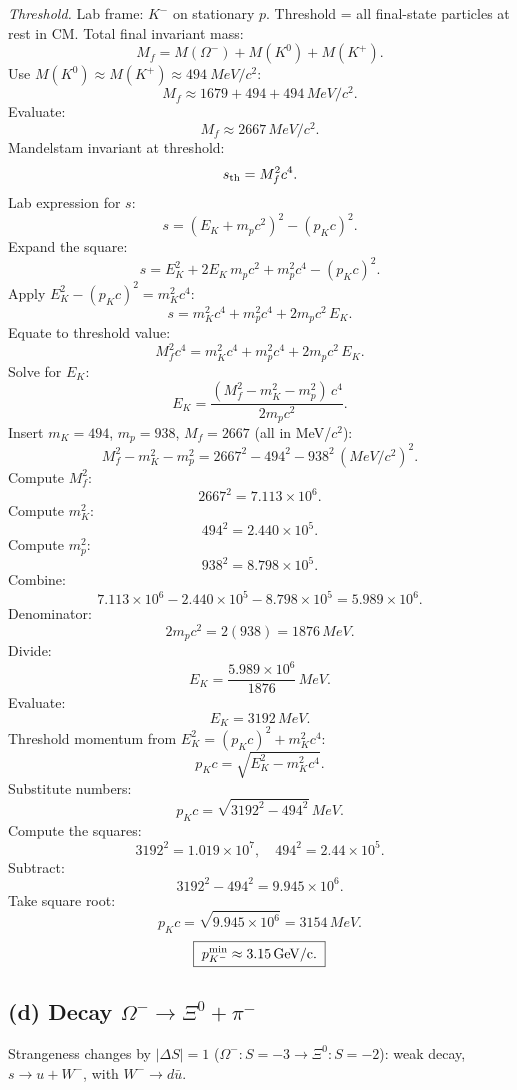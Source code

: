 \documentclass[11pt]{article}
\begin{document}
\textit{Threshold.} Lab frame: $K^-$ on stationary $p$. Threshold = all final-state particles at rest in CM. Total final invariant mass:
\[ M_f = M(\Omega^-) + M(K^0) + M(K^+). \]
Use $M(K^0)\approx M(K^+)\approx \SI{494}{MeV/c^2}$:
\[ M_f \approx 1679 + 494 + 494\,\si{MeV/c^2}. \]
Evaluate:
\[ M_f \approx 2667\,\si{MeV/c^2}. \]
Mandelstam invariant at threshold:
\[ s_{\rm th} = M_f^2 c^4. \]
Lab expression for $s$:
\[ s = (E_K + m_p c^2)^2 - (p_K c)^2. \]
Expand the square:
\[ s = E_K^2 + 2 E_K\, m_p c^2 + m_p^2 c^4 - (p_K c)^2. \]
Apply $E_K^2 - (p_K c)^2 = m_K^2 c^4$:
\[ s = m_K^2 c^4 + m_p^2 c^4 + 2 m_p c^2\, E_K. \]
Equate to threshold value:
\[ M_f^2 c^4 = m_K^2 c^4 + m_p^2 c^4 + 2 m_p c^2\, E_K. \]
Solve for $E_K$:
\[ E_K = \frac{(M_f^2 - m_K^2 - m_p^2)\,c^4}{2 m_p c^2}. \]
Insert $m_K=494$, $m_p=938$, $M_f=2667$ (all in MeV/$c^2$):
\[ M_f^2 - m_K^2 - m_p^2 = 2667^2 - 494^2 - 938^2\,\si{(MeV/c^2)^2}. \]
Compute $M_f^2$:
\[ 2667^2 = 7.113\times 10^{6}. \]
Compute $m_K^2$:
\[ 494^2 = 2.440\times 10^{5}. \]
Compute $m_p^2$:
\[ 938^2 = 8.798\times 10^{5}. \]
Combine:
\[ 7.113\times 10^{6} - 2.440\times 10^{5} - 8.798\times 10^{5} = 5.989\times 10^{6}. \]
Denominator:
\[ 2 m_p c^2 = 2(938) = 1876\,\si{MeV}. \]
Divide:
\[ E_K = \frac{5.989\times 10^{6}}{1876}\,\si{MeV}. \]
Evaluate:
\[ E_K = 3192\,\si{MeV}. \]
Threshold momentum from $E_K^2 = (p_K c)^2 + m_K^2 c^4$:
\[ p_K c = \sqrt{E_K^2 - m_K^2 c^4}. \]
Substitute numbers:
\[ p_K c = \sqrt{3192^2 - 494^2}\,\si{MeV}. \]
Compute the squares:
\[ 3192^2 = 1.019\times 10^{7},\quad 494^2 = 2.44\times 10^{5}. \]
Subtract:
\[ 3192^2 - 494^2 = 9.945\times 10^{6}. \]
Take square root:
\[ p_K c = \sqrt{9.945\times 10^{6}} = 3154\,\si{MeV}. \]
\[ \boxed{\;p_{K^-}^{\rm min} \approx \SI{3.15}{GeV/c}.\;} \]

\subsection*{(d) Decay $\Omega^-\to \Xi^0 + \pi^-$}

Strangeness changes by $|\Delta S|=1$ ($\Omega^-:S=-3 \to \Xi^0:S=-2$): weak decay, $s\to u + W^-$, with $W^-\to d\bar u$.
\end{document}
